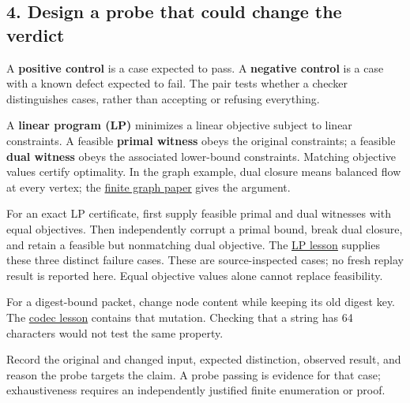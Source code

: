 \documentclass[
  11pt,
]{article}
\begin{document}
\subsection{4. Design a probe that could change the
verdict}\label{design-a-probe-that-could-change-the-verdict}

A \textbf{positive control} is a case expected to pass. A
\textbf{negative control} is a case with a known defect expected to
fail. The pair tests whether a checker distinguishes cases, rather than
accepting or refusing everything.

A \textbf{linear program (LP)} minimizes a linear objective subject to
linear constraints. A feasible \textbf{primal witness} obeys the
original constraints; a feasible \textbf{dual witness} obeys the
associated lower-bound constraints. Matching objective values certify
optimality. In the graph example, dual closure means balanced flow at
every vertex; the
\href{https://github.com/dbccpage/the_symbol_game/blob/593230f7daba7aa04d7c41dd456dfbd00a39bcbd/omega_engine_atlas/coda_atlas/omega_engine_pfp/001_pfp_discrete_cochain_retraction_and_toy_involutions/paper.md}{finite
graph paper} gives the argument.

For an exact LP certificate, first supply feasible primal and dual
witnesses with equal objectives. Then independently corrupt a primal
bound, break dual closure, and retain a feasible but nonmatching dual
objective. The
\href{https://github.com/dbccpage/the_symbol_game/blob/52cb5457f6c485ba548cfd292f6012a941ed22cf/omega_engine_education/the_symbol_game/lessons/system_integration/200_intermediates/02_exact_lp_certificates.ipynb}{LP
lesson} supplies these three distinct failure cases. These are
source-inspected cases; no fresh replay result is reported here. Equal
objective values alone cannot replace feasibility.

For a digest-bound packet, change node content while keeping its old
digest key. The
\href{https://github.com/dbccpage/the_symbol_game/blob/52cb5457f6c485ba548cfd292f6012a941ed22cf/omega_engine_education/the_symbol_game/lessons/system_integration/100_novices/01_codecs_and_tamper_evidence.ipynb}{codec
lesson} contains that mutation. Checking that a string has 64 characters
would not test the same property.

Record the original and changed input, expected distinction, observed
result, and reason the probe targets the claim. A probe passing is
evidence for that case; exhaustiveness requires an independently
justified finite enumeration or proof.
\end{document}
